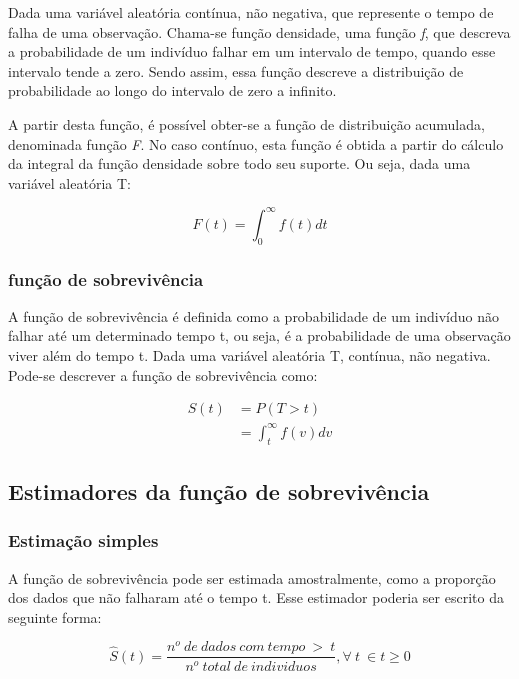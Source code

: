 \documentclass[12pt,a4paper]{article}
\begin{document}
Dada uma variável aleatória contínua, não negativa, que represente o tempo de falha de uma observação. Chama-se função densidade, uma função \textit{f}, que descreva a probabilidade de um indivíduo falhar em um intervalo de tempo, quando esse intervalo tende a zero. Sendo assim, essa função descreve a distribuição de probabilidade ao longo do intervalo de zero a infinito.

A partir desta função, é possível obter-se a função de distribuição acumulada, denominada função \textit{F}. No caso contínuo, esta função é obtida a partir do cálculo da integral da função densidade sobre todo seu suporte. Ou seja, dada uma variável aleatória T:

	$$ F(t) = \int_0^{\infty} f(t)dt $$
		
\subsubsection{função de sobrevivência}

A função de sobrevivência é definida como a probabilidade de um indivíduo não falhar até um determinado tempo t, ou seja, é a probabilidade de uma observação viver além do tempo t. Dada uma variável aleatória T, contínua, não negativa. Pode-se descrever a função de sobrevivência como:

\begin{equation*}
	\begin{split}
		S(t) & = P(T > t) \\
		& = \int_t^{\infty} f(v)dv 
  	\end{split}
\end{equation*} 


\subsection{Estimadores da função de sobrevivência}

\subsubsection{Estimação simples}

A função de sobrevivência pode ser estimada amostralmente, como a proporção dos dados que não falharam até o tempo t. Esse estimador poderia ser escrito da seguinte forma:

$$ \hat{S}(t) = \dfrac{n^o \ de \ dados \ com \ tempo \ > \ t}{n^o \ total \ de \ individuos}, \forall \ t \ \in t\ge 0$$
\end{document}
